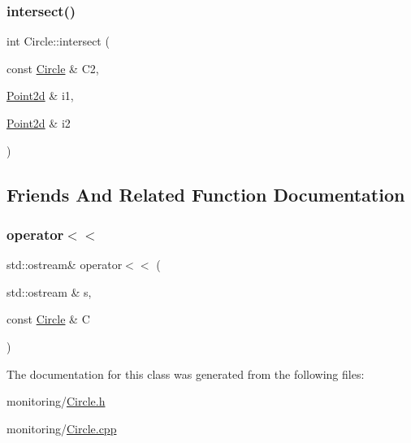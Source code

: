 \subsubsection{\texorpdfstring{intersect()}{intersect()}}
{\footnotesize\ttfamily int Circle\+::intersect (\begin{DoxyParamCaption}\item[{const \hyperlink{class_circle}{Circle} \&}]{C2,  }\item[{\hyperlink{class_point2d}{Point2d} \&}]{i1,  }\item[{\hyperlink{class_point2d}{Point2d} \&}]{i2 }\end{DoxyParamCaption})}



\subsection{Friends And Related Function Documentation}
\mbox{\label{class_circle_a3f0511cf13a23beca631b23f41b491b5}} 
\subsubsection{\texorpdfstring{operator$<$$<$}{operator<<}}
{\footnotesize\ttfamily std\+::ostream\& operator$<$$<$ (\begin{DoxyParamCaption}\item[{std\+::ostream \&}]{s,  }\item[{const \hyperlink{class_circle}{Circle} \&}]{C }\end{DoxyParamCaption})\hspace{0.3cm}{\ttfamily [friend]}}



The documentation for this class was generated from the following files\+:\begin{DoxyCompactItemize}
\item 
monitoring/\hyperlink{_circle_8h}{Circle.\+h}\item 
monitoring/\hyperlink{_circle_8cpp}{Circle.\+cpp}\end{DoxyCompactItemize}
